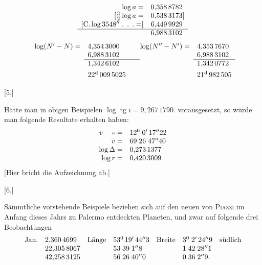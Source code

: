 \[
\begin{array}{rl}
\log a=&0{,}358\,8782\\
{}[\tfrac32\log a=&0{,}538\,3173]\\
{}[\mathrm{C.}\log3548''\;\text{. . .}=]&6{,}449\,9929\\\cline{1-2}
&6{,}988\,3102
\end{array}
\]
\[
\begin{array}{rl@{\qquad}rl}
\log(N'-N)=&4{,}354\,3000&\log(N''-N')=&4{,}353\,7670\\
&6{,}988\,3102&&6{,}988\,3102\\\cline{2-2}\cline{4-4}
&1{,}342\,6102&&1{,}342\,0772\\[4pt]
&22^{\mathrm d}\,009\,5025&&21^{\mathrm d}\,982\,505
\end{array}
\]
\begin{center}[5.]\end{center}
\noindent{\small [S. 14]}\par
\noindent\hspace*{\parindent}Hätte man in obigen Beispielen $\log\operatorname{tg}i=9{,}267\,1790$. vorausgesetzt, so würde man folgende Resultate erhalten haben:
\[
\begin{array}{rl}
v-\AstNode=&12^0\;0'\,17''22\\
v=&69\;26\;47''40\\
\log\Delta=&0{,}273\,1377\\
\log r=&0{,}420\,3009
\end{array}
\]
\noindent\hspace*{\parindent}[Hier bricht die Aufzeichnung ab.]
\begin{center}[6.]\end{center}
\noindent{\small [S. 16]}\par
\noindent\hspace*{\parindent}Sämmtliche vorstehende Beispiele beziehen sich auf den neuen von \textsc{Piazzi} im Anfang dieses Jahrs zu Palermo entdeckten Planeten, und zwar auf folgende drei Beobachtungen
{\small\setlength{\arraycolsep}{3pt}
\[
\begin{array}{ll@{\quad}ll@{\quad}lll}
\text{Jan.}&2{,}360\,4699&\text{Länge}&53^0\,19'\,44''3&\text{Breite}&3^0\;2'\,24''9&\text{südlich}\\
&22{,}305\,8067&&53\;39\;1''8&&1\;42\;28''1&\\
&42{,}258\,3125&&56\;26\;40''0&&0\;36\;2''9.&
\end{array}
\]}

